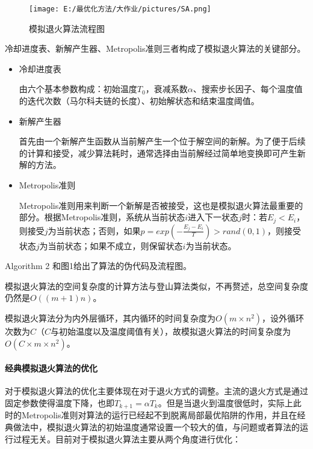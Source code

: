\documentclass[UTF8]{ctexart}
\begin{document}
\begin{figure}
	\centering
	\texttt{[image: E:/最优化方法/大作业/pictures/SA.png]}\caption{模拟退火算法流程图}
\end{figure}

冷却进度表、新解产生器、Metropolis准则三者构成了模拟退火算法的关键部分。

\begin{itemize}
	\item
	冷却进度表
	
	由六个基本参数构成：初始温度\(T_0\)，衰减系数\(\alpha\)、搜索步长因子、每个温度值的迭代次数（马尔科夫链的长度）、初始解状态和结束温度阈值。
	\item
	新解产生器
	
	首先由一个新解产生函数从当前解产生一个位于解空间的新解。为了便于后续的计算和接受，减少算法耗时，通常选择由当前解经过简单地变换即可产生新解的方法。
	\item
	Metropolis准则
	
	Metropolis准则用来判断一个新解是否被接受，这也是模拟退火算法最重要的部分。根据Metropolis准则，系统从当前状态\(i\)进入下一状态\(j\)时：若\(E_j<E_i\)，则接受\(j\)为当前状态；否则，如果\(p=exp(-\frac{E_j-E_i}{T})>rand(0,1)\)，则接受状态\(j\)为当前状态；如果不成立，则保留状态\(i\)为当前状态。
\end{itemize}

Algorithm 2 和图1给出了算法的伪代码及流程图。

模拟退火算法的空间复杂度的计算方法与登山算法类似，不再赘述，总空间复杂度仍然是\(O((m+1)n)\)。

模拟退火算法分为内外层循环，其内循环的时间复杂度为\(O(m\times n^2)\)，设外循环次数为\(C\)（\(C\)与初始温度以及温度阈值有关），故模拟退火算法的时间复杂度为\(O(C\times m\times n^2)\)。

\paragraph{经典模拟退火算法的优化}
对于模拟退火算法的优化主要体现在对于退火方式的调整。主流的退火方式是通过固定参数使得温度下降，也即\(T_{k+1}=\alpha T_k\)。但是当退火到温度很低时，实际上此时的Metropolis准则对算法的运行已经起不到脱离局部最优陷阱的作用，并且在经典做法中，模拟退火算法的初始温度通常设置一个较大的值，与问题或者算法的运行过程无关。目前对于模拟退火算法主要从两个角度进行优化：
\end{document}
